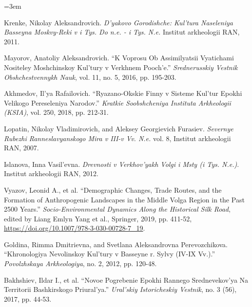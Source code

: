 \documentclass[10pt,onecolumn]{intellte}
\newlength{\csllabelwidth}
\newenvironment{CSLReferences}[2]
 {\par\vspace{2pt}%
  \begin{list}{}{%
  \normalfont\rmfamily\mdseries\fontsize{10pt}{15pt}\selectfont\raggedright
  \hyphenpenalty=50\exhyphenpenalty=50\emergencystretch=3em%
  \renewcommand{\bibitem}[2][]{\item\hypertarget{##2}{}}%
  \setlength{\lineskiplimit}{-6pt}%
  \setlength{\leftmargin}{\csllabelwidth}%
  \setlength{\itemindent}{-\csllabelwidth}%
  \setlength{\labelwidth}{\csllabelwidth}%
  \setlength{\labelsep}{0pt}%
  \setlength{\parsep}{0pt}%
  \setlength{\topsep}{0pt}%
  \setlength{\partopsep}{0pt}%
  \setlength{\itemsep}{2pt}}}
 {\end{list}}
\newcommand{\CSLLeftMargin}[1]{\makebox[\csllabelwidth][l]{\normalfont\rmfamily\mdseries\fontsize{10pt}{15pt}\selectfont #1}}
\newcommand{\CSLRightInline}[1]{\normalfont\rmfamily\mdseries\fontsize{10pt}{15pt}\selectfont #1}
\begin{document}
\begin{CSLReferences}{0}{0}
\CSLLeftMargin{9. }%
\CSLRightInline{Krenke, Nikolay Aleksandrovich. \emph{D'yakovo
Gorodishche: Kul'tura Naseleniya Basseyna Moskvy-Reki v i Tys. Do n.e. -
i Tys. N.e.} Institut arkheologii RAN, 2011.}

\CSLLeftMargin{10. }%
\CSLRightInline{Mayorov, Anatoliy Aleksandrovich. {``K Voprosu Ob
Assimilyatsii Vyatichami Nositeley Moshchinskoy Kul'tury v Verkhnem
Pooch'e.''} \emph{Srednerusskiy Vestnik Obshchestvennykh Nauk}, vol. 11,
no. 5, 2016, pp. 195-203.}

\CSLLeftMargin{11. }%
\CSLRightInline{Akhmedov, Il'ya Rafailovich. {``Ryazano-Okskie Finny v
Sisteme Kul'tur Epokhi Velikogo Pereseleniya Narodov.''} \emph{Kratkie
Soobshcheniya Instituta Arkheologii (KSIA)}, vol. 250, 2018, pp.
212-31.}

\CSLLeftMargin{12. }%
\CSLRightInline{Lopatin, Nikolay Vladimirovich, and Aleksey Georgievich
Furasiev. \emph{Severnye Rubezhi Ranneslavyanskogo Mira v III-v Vv.
N.e.} vol. 8, Institut arkheologii RAN, 2007.}

\CSLLeftMargin{13. }%
\CSLRightInline{Islanova, Inna Vasil'evna. \emph{Drevnosti v
Verkhov'yakh Volgi i Msty (i Tys. N.e.)}. Institut arkheologii RAN,
2012.}

\CSLLeftMargin{14. }%
\CSLRightInline{Vyazov, Leonid A., et al. {``Demographic Changes, Trade
Routes, and the Formation of Anthropogenic Landscapes in the Middle
Volga Region in the Past 2500 Years.''} \emph{Socio-Environmental
Dynamics Along the Historical Silk Road}, edited by Liang Emlyn Yang et
al., Springer, 2019, pp. 411-52,
\url{https://doi.org/10.1007/978-3-030-00728-7_19}.}

\CSLLeftMargin{15. }%
\CSLRightInline{Goldina, Rimma Dmitrievna, and Svetlana Aleksandrovna
Perevozchikova. {``Khronologiya Nevolinskoy Kul'tury v Basseyne r. Sylvy
(IV-IX Vv.).''} \emph{Povolzhskaya Arkheologiya}, no. 2, 2012, pp.
120-48.}

\CSLLeftMargin{16. }%
\CSLRightInline{Bakhshiev, Ildar I., et al. {``Novoe Pogrebenie Epokhi
Rannego Srednevekov'ya Na Territorii Bashkirskogo Priural'ya.''}
\emph{Ural'skiy Istoricheskiy Vestnik}, no. 3 (56), 2017, pp. 44-53.}


\end{CSLReferences}
\end{document}
